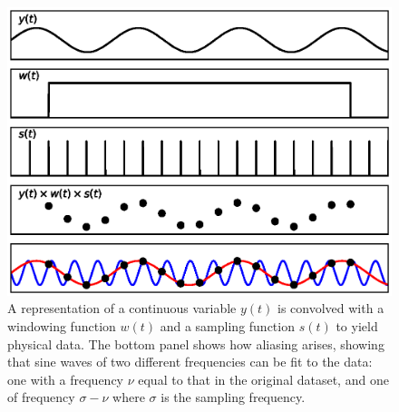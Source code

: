 \begin{figure}
    \includegraphics[width=\columnwidth, trim = 0mm 10mm 0mm 10mm]{images/convolve.eps}
    \captionsetup{singlelinecheck=off}
    \caption{A representation of a continuous variable $y(t)$ is convolved with a windowing function $w(t)$ and a sampling function $s(t)$ to yield physical data.  The bottom panel shows how aliasing arises, showing that sine waves of two different frequencies can be fit to the data: one with a frequency $\nu$ equal to that in the original dataset, and one of frequency $\sigma-\nu$ where $\sigma$ is the sampling frequency.}
   \label{fig:convolve}
\end{figure}

